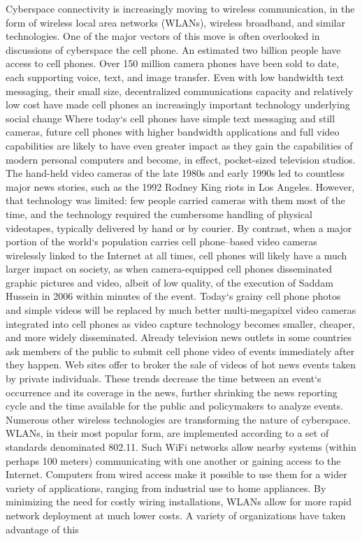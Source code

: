 \documentclass[11pt,a4paper]{article}
\begin{document}
Cyberspace connectivity is increasingly moving to wireless communication, in the form of wireless local area networks (WLANs), wireless broadband, and similar technologies. One of the major vectors of this move is often overlooked in discussions of cyberspace the cell phone. An estimated two billion people have access to cell phones. Over 150 million camera phones have been sold to date, each supporting voice, text, and image transfer. Even with low
bandwidth text messaging, their small size, decentralized communications capacity and relatively low cost have made cell phones an increasingly important technology underlying social change
	Where today‘s cell phones have simple text messaging and still cameras, future cell phones with higher bandwidth applications and full video
capabilities are likely to have even greater impact as they gain the capabilities of modern personal computers and become, in effect, pocket-sized television studios. The hand-held video cameras of the late 1980s and early 1990s led to countless major news stories, such as the 1992 Rodney King riots in Los Angeles. However, that technology was limited: few people carried
cameras with them most of the time, and the technology required the cumbersome handling of physical videotapes, typically delivered by hand or by courier.
By contrast, when a major portion of the world‘s population carries cell phone–based video cameras wirelessly linked to the Internet at all times,
cell phones will likely have a much larger impact on society, as when camera-equipped cell phones disseminated graphic pictures and video, albeit of low
quality, of the execution of Saddam Hussein in 2006 within minutes of the event. Today‘s grainy cell phone photos and simple videos will be replaced by much
better multi-megapixel video cameras integrated into cell phones as video capture technology becomes smaller, cheaper, and more widely disseminated. Already television news outlets in some countries ask members of the public to submit cell phone video of events immediately after they happen. Web sites offer
to broker the sale of videos of hot news events taken by private individuals. These trends decrease the time between an event‘s occurrence and its coverage in the news, further shrinking the news reporting cycle and the time available for the public and policymakers to analyze events.
 Numerous other wireless technologies are transforming the nature of cyberspace. WLANs, in their most popular form, are implemented according to a set
of standards denominated 802.11. Such WiFi networks allow nearby systems (within perhaps 100 meters) communicating with one another or gaining access to the Internet. Computers from wired access make it possible to use them for a wider variety of applications, ranging from industrial use to home
appliances. By minimizing the need for costly wiring installations, WLANs allow for more rapid network deployment at much lower costs. A variety of organizations have taken advantage of this\\
\end{document}
